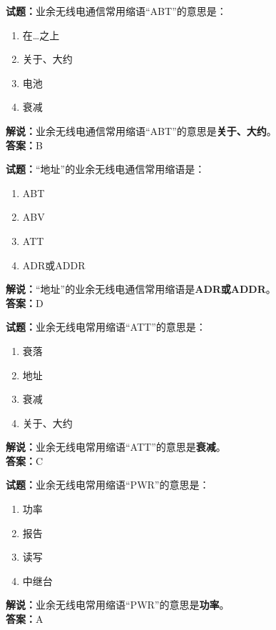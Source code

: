 \documentclass{ctexbook}
\begin{document}
\vspace{1em}

\textbf{试题：}业余无线电通信常用缩语“ABT”的意思是：
\begin{enumerate}[leftmargin=3em]
  \item 在…之上
  \item 关于、大约
  \item 电池
  \item 衰减
\end{enumerate}
\noindent\textbf{解说：}业余无线电通信常用缩语“ABT”的意思是\textbf{关于、大约}。\\\noindent\textbf{答案：}B

\vspace{1em}

\textbf{试题：}“地址”的业余无线电通信常用缩语是：
\begin{enumerate}[leftmargin=3em]
  \item ABT
  \item ABV
  \item ATT
  \item ADR或ADDR
\end{enumerate}
\noindent\textbf{解说：}“地址”的业余无线电通信常用缩语是\textbf{ADR或ADDR}。\\\noindent\textbf{答案：}D

\vspace{1em}

\textbf{试题：}业余无线电常用缩语“ATT”的意思是：
\begin{enumerate}[leftmargin=3em]
  \item 衰落
  \item 地址
  \item 衰减
  \item 关于、大约
\end{enumerate}
\noindent\textbf{解说：}业余无线电常用缩语“ATT”的意思是\textbf{衰减}。\\\noindent\textbf{答案：}C

\vspace{1em}

\textbf{试题：}业余无线电常用缩语“PWR”的意思是：
\begin{enumerate}[leftmargin=3em]
  \item 功率
  \item 报告
  \item 读写
  \item 中继台
\end{enumerate}
\noindent\textbf{解说：}业余无线电常用缩语“PWR”的意思是\textbf{功率}。\\\noindent\textbf{答案：}A
\end{document}
